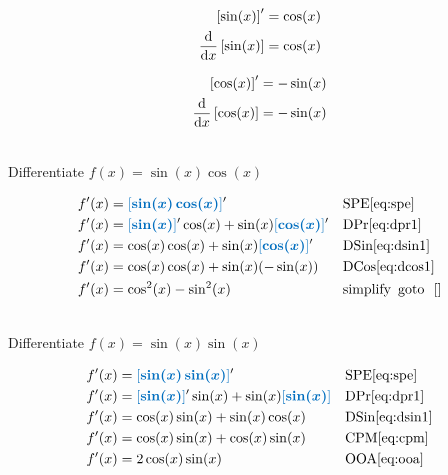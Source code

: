 \documentclass[20150903-160354-rs2.2-MarksMathNotebook.tex]{subfiles}
\begin{document}
\begin{arule}
\begin{align}
	\left[ \sin(x) \right]' &= \cos (x) \label{eq:dsin1} \\
	\dfrac{\mathrm{d}}{\mathrm{d}x} \left[ \sin(x) \right] & = \cos (x)  \label{eq:dsin2}
\end{align}
\end{arule}


\begin{arule}
\begin{align}
	\left[ \cos(x) \right]' &= -\sin (x) \label{eq:dcos1} \\
	\dfrac{\mathrm{d}}{\mathrm{d}x} \left[ \cos(x) \right] & = -\sin (x)  \label{eq:dcos2}
\end{align}
\end{arule}

\begin{example}[id:20150910-115935] \label{20150910-115935} \hfill \\

Differentiate $f(x)=\sin(x)\cos(x)$

\soln

\solnsteps
\begin{align*}
f'(x) & = \farg{\sin(x)\cos(x)}' && \text{SPE} \eqref{eq:spe} \\
f'(x) & = \farg{\sin(x)}'\cos(x)+ \sin(x)\farg{\cos(x)}' && \text{DPr} \eqref{eq:dpr1} \\
f'(x) & = \cos (x) \cos (x) + \sin(x)\farg{\cos(x)}' && \text{DSin} \eqref{eq:dsin1} \\
f'(x) &= \cos (x) \cos (x) + \sin(x) (-\sin(x)) && \text{DCos} \eqref{eq:dcos1} \\
f'(x) &= \cos^2(x)-\sin^2(x) && \text{simplify} \text{\, goto \,} \, \ref{} %
\end{align*}

\end{example}

\begin{example}[id:20141209-151354] \label{20141209-151354} \hfill \\

Differentiate $f(x)=\sin(x)\sin(x)$

\soln

\solnsteps
\begin{align*}
f'(x) &= \farg{\sin(x)\sin(x)}' && \text{SPE} \eqref{eq:spe} \\
f'(x) &= \farg{\sin(x)}' \sin(x) + \sin (x) \farg{\sin(x)} && \text{DPr} \eqref{eq:dpr1} \\
f'(x) &= \cos(x) \sin(x) + \sin (x) \cos(x) && \text{DSin} \eqref{eq:dsin1} \\
f'(x) &= \cos(x)\sin(x) + \cos(x)\sin(x) && \text{CPM} \eqref{eq:cpm} \\
f'(x) &= 2\cos(x)\sin(x) && \text{OOA} \eqref{eq:ooa} %
\end{align*}
\end{example}
\end{document}
